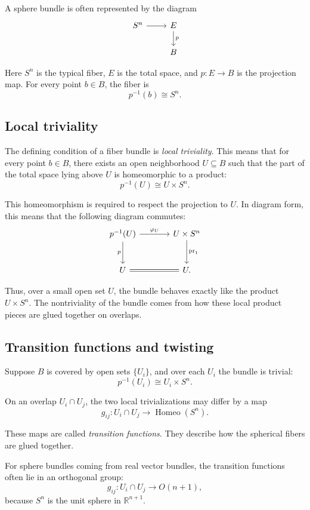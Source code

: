 \documentclass[12pt,a4paper]{article}
\theoremstyle{notespace}
\begin{document}
A sphere bundle is often represented by the diagram
\[
\begin{tikzcd}
	S^n \arrow[r] & E \arrow[d,"p"] \\
	& B
\end{tikzcd}
\]

Here \(S^n\) is the typical fiber, \(E\) is the total space, and \(p:E\to B\) is the projection map. For every point \(b\in B\), the fiber is
\[
p^{-1}(b)\cong S^n.
\]

\subsection{Local triviality}

The defining condition of a fiber bundle is \emph{local triviality}. This means that for every point \(b\in B\), there exists an open neighborhood \(U\subseteq B\) such that the part of the total space lying above \(U\) is homeomorphic to a product:
\[
p^{-1}(U)\cong U\times S^n.
\]

This homeomorphism is required to respect the projection to \(U\). In diagram form, this means that the following diagram commutes:
\[
\begin{tikzcd}[column sep=large,row sep=large]
	p^{-1}(U) \arrow[r,"\varphi_U"] \arrow[d,"p"'] 
	& U\times S^n \arrow[d,"\mathrm{pr}_1"] \\
	U \arrow[r,equal] 
	& U .
\end{tikzcd}
\]

Thus, over a small open set \(U\), the bundle behaves exactly like the product \(U\times S^n\). The nontriviality of the bundle comes from how these local product pieces are glued together on overlaps.

\subsection{Transition functions and twisting}

Suppose \(B\) is covered by open sets \(\{U_i\}\), and over each \(U_i\) the bundle is trivial:
\[
p^{-1}(U_i)\cong U_i\times S^n.
\]

On an overlap \(U_i\cap U_j\), the two local trivializations may differ by a map
\[
g_{ij}:U_i\cap U_j\to \operatorname{Homeo}(S^n).
\]

These maps are called \emph{transition functions}. They describe how the spherical fibers are glued together.

For sphere bundles coming from real vector bundles, the transition functions often lie in an orthogonal group:
\[
g_{ij}:U_i\cap U_j\to O(n+1),
\]
because \(S^n\) is the unit sphere in \(\mathbb{R}^{n+1}\).
\end{document}
